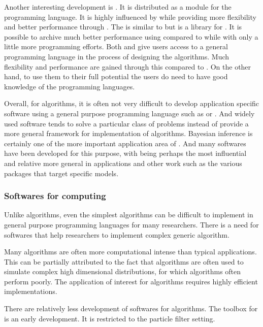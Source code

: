 Another interesting development is \pymc \cite{pymc}. It is distributed as a
module for the \python programming language. It is highly influenced by \bugs
while providing more flexibility and better performance through \python. The
\cppbugs \cite{cppbugs} is similar to \pymc but is a library for \cpp. It is
possible to archive much better performance using \cppbugs compared to \bugs
while with only a little more programming efforts. Both \pymc and \cppbugs
give users access to a general programming language in the process of
designing the algorithms. Much flexibility and performance are gained through
this compared to \bugs. On the other hand, to use them to their full potential
the users do need to have good knowledge of the programming languages.

Overall, for \mcmc algorithms, it is often not very difficult to develop
application specific software using a general purpose programming language
such as \rlang or \cpp. And widely used software tends to solve a particular
class of problems instead of provide a more general framework for
implementation of algorithms. Bayesian inference is certainly one of the more
important application area of \mcmc. And many softwares have been developed
for this purpose, with \bugs being perhaps the most influential and relative
more general in applications and other work such as the various \rlang
packages that target specific models.

\subsubsection{Softwares for \protect\smc computing}
\label{ssub:Softwares for smc computing}

Unlike \mcmc algorithms, even the simplest \smc algorithms can be difficult to
implement in general purpose programming languages for many researchers. There
is a need for softwares that help researchers to implement complex generic
\smc algorithm.

Many \smc algorithms are often more computational intense than typical \mcmc
applications. This can be partially attributed to the fact that \smc
algorithms are often used to simulate complex high dimensional distributions,
for which \mcmc algorithms often perform poorly.  The application of interest
for \smc algorithms requires highly efficient implementations.

There are relatively less development of softwares for \smc algorithms. The
\pflib \cite{pflib} toolbox for \matlab is an early development. It is
restricted to the particle filter setting.

